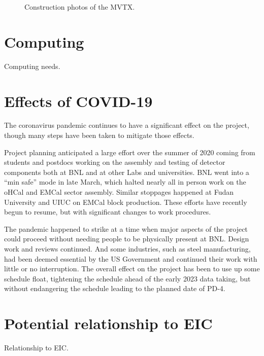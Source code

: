 \begin{figure}[!hbt]
 \begin{center}
        \caption{\label{fig:mvtx}Construction photos of the MVTX.}
 \end{center}
\end{figure}


\section{Computing}
\label{sec:computing}

Computing needs.

\section{Effects of COVID-19}
\label{sec:covid}

The coronavirus pandemic continues to have a significant effect on the
project, though many steps have been taken to mitigate those
effects.

Project planning anticipated a large effort over the summer of 2020
coming from students and postdocs working on the assembly and testing
of detector components both at BNL and at other Labs and universities.
BNL went into a ``min safe'' mode in late March, which halted nearly
all in person work on the oHCal and EMCal sector assembly.  Similar
stoppages happened at Fudan University and UIUC on EMCal block
production.  These efforts have recently begun to resume, but with
significant changes to work procedures.

The pandemic happened to strike at a time when major aspects of the
project could proceed without needing people to be physically present
at BNL.  Design work and reviews continued.  And some industries, such
as steel manufacturing, had been deemed essential by the US Government
and continued their work with little or no interruption.  The overall
effect on the project has been to use up some schedule float,
tightening the schedule ahead of the early 2023 data taking, but
without endangering the schedule leading to the planned date of PD-4.


\section{Potential relationship to EIC}
\label{sec:eic}

Relationship to EIC.

